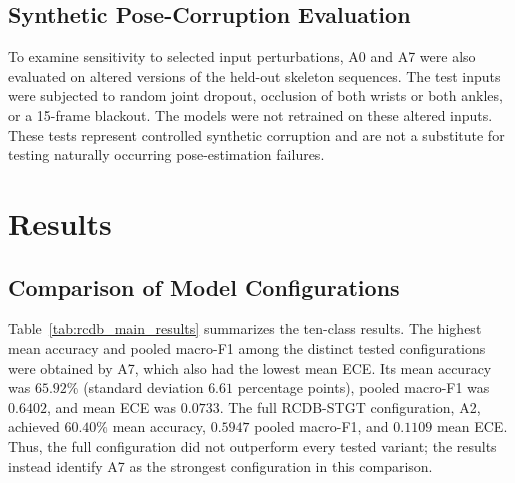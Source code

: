 \subsection{Synthetic Pose-Corruption Evaluation}

To examine sensitivity to selected input perturbations, A0 and A7 were also evaluated on altered versions of the held-out skeleton sequences. The test inputs were subjected to random joint dropout, occlusion of both wrists or both ankles, or a 15-frame blackout. The models were not retrained on these altered inputs. These tests represent controlled synthetic corruption and are not a substitute for testing naturally occurring pose-estimation failures.

\section{Results}\label{sec:results}

\subsection{Comparison of Model Configurations}

Table~\ref{tab:rcdb_main_results} summarizes the ten-class results. The highest mean accuracy and pooled macro-F1 among the distinct tested configurations were obtained by A7, which also had the lowest mean ECE. Its mean accuracy was $65.92\%$ (standard deviation $6.61$ percentage points), pooled macro-F1 was $0.6402$, and mean ECE was $0.0733$. The full RCDB-STGT configuration, A2, achieved $60.40\%$ mean accuracy, $0.5947$ pooled macro-F1, and $0.1109$ mean ECE. Thus, the full configuration did not outperform every tested variant; the results instead identify A7 as the strongest configuration in this comparison.

